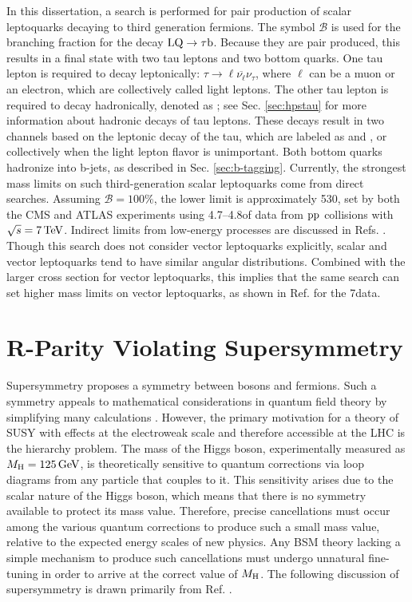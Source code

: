 In this dissertation, a search is performed for pair production of scalar leptoquarks decaying to third generation fermions. The symbol $\mathcal{B}$ is used for the branching fraction for the decay $\text{LQ} \rightarrow \tau \mathrm{b}$. Because they are pair produced, this results in a final state with two tau leptons and two bottom quarks. One tau lepton is required to decay leptonically: $\tau \rightarrow \ell \overline{\nu_{\ell}} \nu_{\tau}$, where $\ell$ can be a muon or an electron, which are collectively called light leptons. The other tau lepton is required to decay hadronically, denoted as \tauh; see Sec. \ref{sec:hpstau} for more information about hadronic decays of tau leptons. These decays result in two channels based on the leptonic decay of the tau, which are labeled as \etau and \mutau, or collectively \ltau when the light lepton flavor is unimportant. Both bottom quarks hadronize into b-jets, as described in Sec. \ref{sec:b-tagging}. Currently, the strongest mass limits on such third-generation scalar leptoquarks come from direct searches. Assuming $\mathcal{B}=100\%$, the lower limit is approximately 530\GeV, set by both the CMS \cite{CMSLQ3} and ATLAS \cite{ATLASLQ3} experiments using 4.7--4.8\fbinv of data from $\mathrm{p}\mathrm{p}$ collisions with $\sqrt{s}=7\,\text{Te\hspace{-.08em}V}$. Indirect limits from low-energy processes are discussed in Refs. \cite{ModelIndLQ,Leurer:1993em, MuchAdo, LQreview}. Though this search does not consider vector leptoquarks explicitly, scalar and vector leptoquarks tend to have similar angular distributions. Combined with the larger cross section for vector leptoquarks, this implies that the same search can set higher mass limits on vector leptoquarks, as shown in Ref. \cite{CMSLQ3} for the 7\TeV data.


\section{R-Parity Violating Supersymmetry
\label{sec:RPVSUSY}}

Supersymmetry proposes a symmetry between bosons and fermions. Such a symmetry appeals to mathematical considerations in quantum field theory by simplifying many calculations \cite{Peskin}. However, the primary motivation for a theory of SUSY with effects at the electroweak scale and therefore accessible at the LHC is the hierarchy problem. The mass of the Higgs boson, experimentally measured as $M_{\mathrm{H}} = 125\,\text{Ge\hspace{-.08em}V}$, is theoretically sensitive to quantum corrections via loop diagrams from any particle that couples to it. This sensitivity arises due to the scalar nature of the Higgs boson, which means that there is no symmetry available to protect its mass value. Therefore, precise cancellations must occur among the various quantum corrections to produce such a small mass value, relative to the expected energy scales of new physics. Any BSM theory lacking a simple mechanism to produce such cancellations must undergo unnatural fine-tuning in order to arrive at the correct value of $M_{\mathrm{H}}$. The following discussion of supersymmetry is drawn primarily from Ref. \cite{Primer}.


